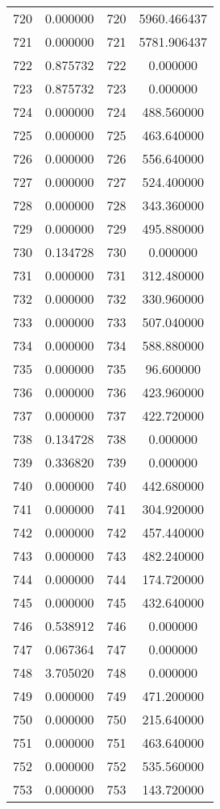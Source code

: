 \documentclass[12pt]{article}
\begin{document}
\begin{longtable}{@{}cccc@{}}
720 & 0.000000 & 720 & 5960.466437 \\
721 & 0.000000 & 721 & 5781.906437 \\
722 & 0.875732 & 722 & 0.000000 \\
723 & 0.875732 & 723 & 0.000000 \\
724 & 0.000000 & 724 & 488.560000 \\
725 & 0.000000 & 725 & 463.640000 \\
726 & 0.000000 & 726 & 556.640000 \\
727 & 0.000000 & 727 & 524.400000 \\
728 & 0.000000 & 728 & 343.360000 \\
729 & 0.000000 & 729 & 495.880000 \\
730 & 0.134728 & 730 & 0.000000 \\
731 & 0.000000 & 731 & 312.480000 \\
732 & 0.000000 & 732 & 330.960000 \\
733 & 0.000000 & 733 & 507.040000 \\
734 & 0.000000 & 734 & 588.880000 \\
735 & 0.000000 & 735 & 96.600000 \\
736 & 0.000000 & 736 & 423.960000 \\
737 & 0.000000 & 737 & 422.720000 \\
738 & 0.134728 & 738 & 0.000000 \\
739 & 0.336820 & 739 & 0.000000 \\
740 & 0.000000 & 740 & 442.680000 \\
741 & 0.000000 & 741 & 304.920000 \\
742 & 0.000000 & 742 & 457.440000 \\
743 & 0.000000 & 743 & 482.240000 \\
744 & 0.000000 & 744 & 174.720000 \\
745 & 0.000000 & 745 & 432.640000 \\
746 & 0.538912 & 746 & 0.000000 \\
747 & 0.067364 & 747 & 0.000000 \\
748 & 3.705020 & 748 & 0.000000 \\
749 & 0.000000 & 749 & 471.200000 \\
750 & 0.000000 & 750 & 215.640000 \\
751 & 0.000000 & 751 & 463.640000 \\
752 & 0.000000 & 752 & 535.560000 \\
753 & 0.000000 & 753 & 143.720000 \\

\end{longtable}
\end{document}
